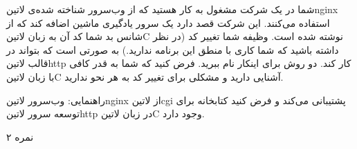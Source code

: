 \documentclass[../main.tex]{subfiles}
\begin{document}

شما در یک شرکت مشغول به کار هستید که از وب‌سرور شناخته شده‌ی ‌لاتین{nginx} استفاده می‌کنند. این شرکت قصد دارد یک سرور یادگیری ماشین اضافه کند که از شانس بد شما کد آن به زبان ‌لاتین{C} نوشته شده است.
وظیفه شما تغییر کد (در نظر داشته باشید که شما کاری با منطق این برنامه ندارید.) به صورتی است که بتواند در قالب ‌لاتین{http} کار کند.
دو روش برای اینکار نام ببرید. فرض کنید که شما به قدر کافی با زبان ‌لاتین{C} آشنایی دارید و مشکلی برای تغییر کد به هر نحو ندارید.

راهنمایی: وب‌سرور ‌لاتین{nginx} از ‌لاتین{cgi} پشتیبانی می‌کند و فرض کنید کتابخانه برای توسعه سرور ‌لاتین{http} در زبان ‌لاتین{C} وجود دارد.

۲ نمره
\end{document}
